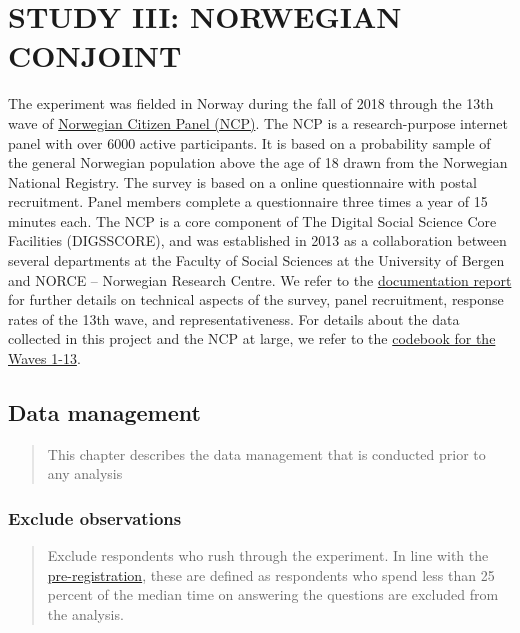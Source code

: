\documentclass[
]{book}
\begin{document}
\hypertarget{part-study-iii-norwegian-conjoint}{%
\part{STUDY III: NORWEGIAN CONJOINT}\label{part-study-iii-norwegian-conjoint}}

The experiment was fielded in Norway during the fall of 2018 through the 13th wave of \href{https://www.uib.no/medborger}{Norwegian Citizen Panel (NCP)}. The NCP is a research-purpose internet panel with over 6000 active participants. It is based on a probability sample of the general Norwegian population above the age of 18 drawn from the Norwegian National Registry. The survey is based on a online questionnaire with postal recruitment. Panel members complete a questionnaire three times a year of 15 minutes each. The NCP is a core component of The Digital Social Science Core Facilities (DIGSSCORE), and was established in 2013 as a collaboration between several departments at the Faculty of Social Sciences at the University of Bergen and NORCE -- Norwegian Research Centre. We refer to the \href{Data/ncp-wave13-documentation.pdf}{documentation report} for further details on technical aspects of the survey, panel recruitment, response rates of the 13th wave, and representativeness. For details about the data collected in this project and the NCP at large, we refer to the \href{Data/ncp-wave13-codebook.pdf}{codebook for the Waves 1-13}.

\hypertarget{data-management-2}{%
\chapter{Data management}\label{data-management-2}}

\begin{quote}
This chapter describes the data management that is conducted prior to any analysis
\end{quote}

\hypertarget{exclude-observations}{%
\section{Exclude observations}\label{exclude-observations}}

\begin{quote}
Exclude respondents who rush through the experiment. In line with the \href{GoogLoser_Prereg_3_\#16823}{pre-registration}, these are defined as respondents who spend less than 25 percent of the median time on answering the questions are excluded from the analysis.
\end{quote}
\end{document}
